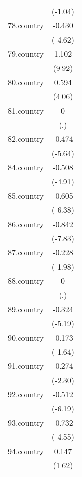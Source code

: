 {\begin{tabular}{l*{1}{c}}
            &     (-1.04)         \\
[1em]
78.country  &      -0.430\sym{***}\\
            &     (-4.62)         \\
[1em]
79.country  &       1.102\sym{***}\\
            &      (9.92)         \\
[1em]
80.country  &       0.594\sym{***}\\
            &      (4.06)         \\
[1em]
81.country  &           0         \\
            &         (.)         \\
[1em]
82.country  &      -0.474\sym{***}\\
            &     (-5.64)         \\
[1em]
84.country  &      -0.508\sym{***}\\
            &     (-4.91)         \\
[1em]
85.country  &      -0.605\sym{***}\\
            &     (-6.38)         \\
[1em]
86.country  &      -0.842\sym{***}\\
            &     (-7.83)         \\
[1em]
87.country  &      -0.228\sym{*}  \\
            &     (-1.98)         \\
[1em]
88.country  &           0         \\
            &         (.)         \\
[1em]
89.country  &      -0.324\sym{***}\\
            &     (-5.19)         \\
[1em]
90.country  &      -0.173         \\
            &     (-1.64)         \\
[1em]
91.country  &      -0.274\sym{*}  \\
            &     (-2.30)         \\
[1em]
92.country  &      -0.512\sym{***}\\
            &     (-6.19)         \\
[1em]
93.country  &      -0.732\sym{***}\\
            &     (-4.55)         \\
[1em]
94.country  &       0.147         \\
            &      (1.62)         \\

\end{tabular}}

